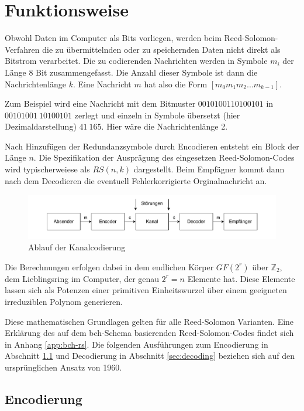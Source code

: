 \chapter{Funktionsweise}\label{ch:operatingPrinciple}

Obwohl Daten im Computer als Bits vorliegen, werden beim Reed-Solomon-Verfahren die zu übermittelnden oder zu speichernden Daten nicht direkt als Bitstrom verarbeitet.
Die zu codierenden Nachrichten werden in Symbole $m_{i}$ der Länge 8 Bit zusammengefasst.
Die Anzahl dieser Symbole ist dann die Nachrichtenlänge $k$.
Eine Nachricht $m$ hat also die Form $[m_{0}m_{1}m_{2}...m_{k-1}]$.

Zum Beispiel wird eine Nachricht mit dem Bitmuster $0010100110100101$ in $00101001\ 10100101$ zerlegt und einzeln in Symbole übersetzt (hier Dezimaldarstellung) $41\ 165$. Hier wäre die Nachrichtenlänge 2.

Nach Hinzufügen der Redundanzsymbole durch Encodieren entsteht ein Block der Länge $n$.
Die Spezifikation der Ausprägung des eingesetzen Reed-Solomon-Codes wird typischerweiese als $RS(n, k)$ dargestellt.
Beim Empfägner kommt dann nach dem Decodieren die eventuell Fehlerkorrigierte Orginalnachricht an.

\begin{figure}[h]
	\centering
	\includegraphics[width=1\textwidth]{figures/Kanalcodierung.drawio.pdf}
	\caption{Ablauf der Kanalcodierung}
	\label{fig:channelcoding}
\end{figure}

Die Berechnungen erfolgen dabei in dem endlichen Körper $GF(2^r)$ über $\mathbb{Z}_2$, dem Lieblingsring im Computer, der genau $2^r=n$ Elemente hat.
Diese Elemente lassen sich als Potenzen einer primitiven Einheitswurzel über einem geeigneten irreduziblen Polynom generieren.

Diese mathematischen Grundlagen gelten für alle Reed-Solomon Varianten. 
Eine Erklärung des auf dem \acrshort{bch}-Schema basierenden Reed-Solomon-Codes findet sich in Anhang \ref{app:bch-rs}.
Die folgenden Ausführungen zum Encodierung in Abschnitt \ref{sec:encoding} und Decodierung in Abschnitt \ref{sec:decoding} beziehen sich auf den ursprünglichen Ansatz von 1960.

\section{Encodierung}\label{sec:encoding}

